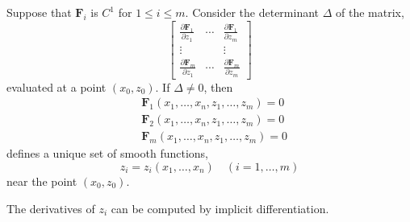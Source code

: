 \begin{thm}
	Suppose that $\mathbf{F}_i$ is $C^1$ for $1 \leq i \leq m$. Consider the determinant $\Delta$ of the matrix,
	\[\left[\begin{array}{ccc}
	\frac{\partial \mathbf{F}_1}{\partial z_1} & \cdots & \frac{\partial \mathbf{F}_1}{\partial z_m} \\
	\vdots & & \vdots \\
	\frac{\partial \mathbf{F}_m}{\partial z_1} & \cdots & \frac{\partial \mathbf{F}_m}{\partial z_m}
	\end{array}\right]\]
	evaluated at a point $(x_0, z_0)$. If $\Delta \neq 0$, then
	\begin{align*}
	&\mathbf{F}_1\left(x_1, \ldots, x_n, z_1, \ldots, z_m\right)=0\\
	&\mathbf{F}_2\left(x_1, \ldots, x_n, z_1, \ldots, z_m\right)=0\\
	&\mathbf{F}_m\left(x_1, \ldots, x_n, z_1, \ldots, z_m\right)=0
	\end{align*}
	defines a unique set of smooth functions,
	\[z_i=z_i\left(x_1, \ldots, x_n\right) \quad(i=1, \ldots, m)\]
	near the point $(x_0, z_0)$.
\end{thm}

\begin{marginfigure}
	The derivatives of $z_i$ can be computed by implicit differentiation.
\end{marginfigure}


